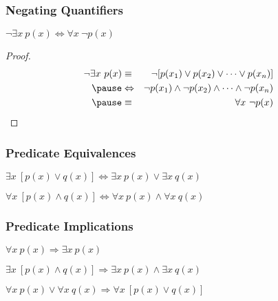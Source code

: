 \documentclass[dvipsnames]{beamer}
\begin{document}
\begin{frame}
  \frametitle{Negating Quantifiers}

  \begin{theorem}
    $\neg \exists x~p(x) \Leftrightarrow \forall x~\neg p(x)$
  \end{theorem}

  \pause
  \begin{proof}
    \begin{eqnarray*}
      \neg \exists x~p(x) & \equiv          & \neg [p(x_1) \vee p(x_2) \vee \cdots
                                              \vee p(x_n)]\\\pause
                          & \Leftrightarrow & \neg p(x_1) \wedge \neg p(x_2) \wedge \cdots
                                              \wedge \neg p(x_n)\\\pause
                          & \equiv          & \forall x~\neg p(x)
    \end{eqnarray*}
  \end{proof}
\end{frame}

\begin{frame}
  \frametitle{Predicate Equivalences}

  \begin{theorem}
    $\exists x~[p(x) \vee q(x)]
      \Leftrightarrow \exists x~p(x) \vee \exists x~q(x)$
  \end{theorem}

  \pause
  \begin{theorem}
    $\forall x~[p(x) \wedge q(x)]
      \Leftrightarrow \forall x~p(x) \wedge \forall x~q(x)$
  \end{theorem}
\end{frame}

\begin{frame}
  \frametitle{Predicate Implications}

  \begin{theorem}
    $\forall x~p(x) \Rightarrow \exists x~p(x)$
  \end{theorem}

  \pause
  \begin{theorem}
    $\exists x~[p(x) \wedge q(x)]
      \Rightarrow \exists x~p(x) \wedge \exists x~q(x)$
  \end{theorem}

  \pause
  \begin{theorem}
    $\forall x~p(x) \vee \forall x~q(x)
      \Rightarrow \forall x~[p(x) \vee q(x)]$
  \end{theorem}
\end{frame}
\end{document}
